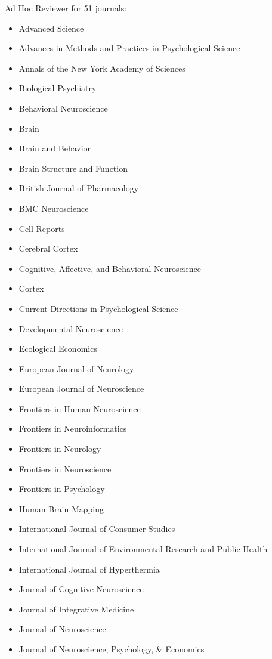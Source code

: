 \documentclass[11pt, letterpaper]{article}
\begin{document}
Ad Hoc Reviewer for 51 journals:
\begin{multicols}{2}
\begin{itemize}[noitemsep]
\itshape
\item Advanced Science
\item Advances in Methods and Practices in Psychological Science
\item Annals of the New York Academy of Sciences
\item Biological Psychiatry
\item Behavioral Neuroscience
\item Brain
\item Brain and Behavior
\item Brain Structure and Function
\item British Journal of Pharmacology
\item BMC Neuroscience 
\item Cell Reports
\item Cerebral Cortex 
\item Cognitive, Affective, and Behavioral Neuroscience 
\item Cortex
\item Current Directions in Psychological Science
\item Developmental Neuroscience 
\item Ecological Economics
\item European Journal of Neurology
\item European Journal of Neuroscience
\item Frontiers in Human Neuroscience 
\item Frontiers in Neuroinformatics 
\item Frontiers in Neurology 
\item Frontiers in Neuroscience 
\item Frontiers in Psychology 
\item Human Brain Mapping 
\item International Journal of Consumer Studies
\item International Journal of Environmental Research and Public Health
\item International Journal of Hyperthermia 
\item Journal of Cognitive Neuroscience 
\item Journal of Integrative Medicine 
\item Journal of Neuroscience 
\item Journal of Neuroscience, Psychology, \& Economics

\end{itemize}
\end{multicols}
\end{document}

